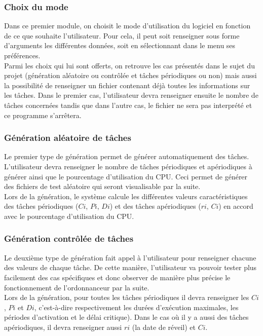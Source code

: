 			\subsubsection{Choix du mode}
				Dans ce premier module, on choisit le mode d’utilisation du logiciel en fonction de ce que souhaite l’utilisateur. Pour cela, il peut soit renseigner sous forme d’arguments les différentes données, soit en sélectionnant dans le menu ses préférences. \\

				Parmi les choix qui lui sont offerts, on retrouve les cas présentés dans le sujet du projet (génération aléatoire ou contrôlée et tâches périodiques ou non) mais aussi la possibilité de renseigner un fichier contenant déjà toutes les informations sur les tâches. Dans le premier cas, l’utilisateur devra renseigner ensuite le nombre de tâches concernées tandis que dans l’autre cas, le fichier ne sera pas interprété et ce programme s’arrêtera.


			\subsubsection{Génération aléatoire de tâches}
				Le premier type de génération permet de générer automatiquement des tâches. L'utilisateur devra renseigner le nombre de tâches périodiques et apériodiques à générer ainsi que le pourcentage d'utilisation du CPU. Ceci permet de générer des fichiers de test aléatoire qui seront visualisable par la suite.\\
				Lors de la génération, le système calcule les différentes valeurs caractéristiques des tâches périodiques ($Ci$, $Pi$, $Di$) et des tâches apériodiques ($ri$, $Ci$) en accord avec le pourcentage d'utilisation du CPU. 

			\subsubsection{Génération contrôlée de tâches}
				Le deuxième type de génération fait appel à l'utilisateur pour renseigner chacune des valeurs de chaque tâche. De cette manière, l'utilisateur va pouvoir tester plus facilement des cas spécifiques et donc observer de manière plus précise le fonctionnement de l'ordonnanceur par la suite. \\
				Lors de la génération, pour toutes les tâches périodiques il devra renseigner les $Ci$, $Pi$ et $Di$, c'est-à-dire respectivement les durées d'exécution maximales, les périodes d'activation et le délai critique). Dans le cas où il y a aussi des tâches apériodiques, il devra renseigner aussi $ri$ (la date de réveil) et $Ci$.

